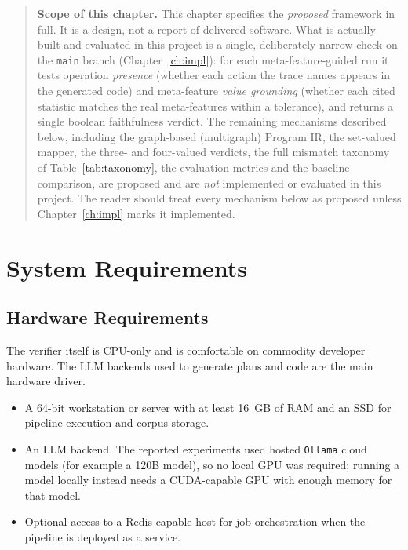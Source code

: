 \begin{quote}
\textbf{Scope of this chapter.} This chapter specifies the
\emph{proposed} framework in full. It is a design, not a report of
delivered software. What is actually built and evaluated in this
project is a single, deliberately narrow check on the \texttt{main}
branch (Chapter~\ref{ch:impl}): for each meta-feature-guided run it
tests operation \emph{presence} (whether each action the trace names
appears in the generated code) and meta-feature \emph{value
grounding} (whether each cited statistic matches the real
meta-features within a tolerance), and returns a single boolean
faithfulness verdict. The remaining mechanisms described below, including the
graph-based (multigraph) Program IR, the set-valued mapper, the
three- and four-valued verdicts, the full mismatch taxonomy of
Table~\ref{tab:taxonomy}, the evaluation metrics and the baseline
comparison, are proposed and are \emph{not} implemented or evaluated
in this project. The reader should treat every mechanism below as
proposed unless Chapter~\ref{ch:impl} marks it implemented.
\end{quote}

\section{System Requirements}

\subsection{Hardware Requirements}

The verifier itself is CPU-only and is comfortable on commodity
developer hardware. The LLM backends used to generate plans and code
are the main hardware driver.

\begin{itemize}
    \item A 64-bit workstation or server with at least 16~GB of RAM
    and an SSD for pipeline execution and corpus storage.
    \item An LLM backend. The reported experiments used hosted
    \texttt{Ollama} cloud models (for example a 120B model), so no
    local GPU was required; running a model locally instead needs a
    CUDA-capable GPU with enough memory for that model.
    \item Optional access to a Redis-capable host for job
    orchestration when the pipeline is deployed as a service.
\end{itemize}

